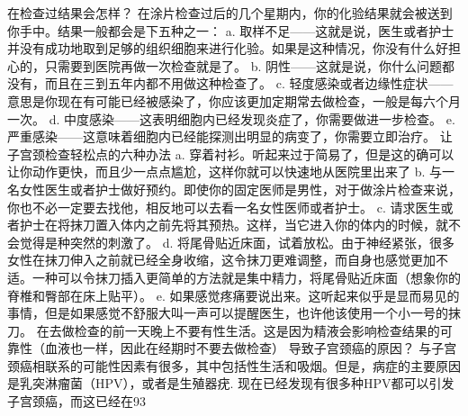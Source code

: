 \documentclass[12pt,UTF8]{ctexbook}
\begin{document}
在检查过结果会怎样？
在涂片检查过后的几个星期内，你的化验结果就会被送到你手中。结果一般都会是下五种之一：
a. 取样不足——这就是说，医生或者护士并没有成功地取到足够的组织细胞来进行化验。如果是这种情况，你没有什么好担心的，只需要到医院再做一次检查就是了。
b. 阴性——这就是说，你什么问题都没有，而且在三到五年内都不用做这种检查了。
c. 轻度感染或者边缘性症状——意思是你现在有可能已经被感染了，你应该更加定期常去做检查，一般是每六个月一次。
d. 中度感染——这表明细胞内已经发现炎症了，你需要做进一步检查。
e. 严重感染——这意味着细胞内已经能探测出明显的病变了，你需要立即治疗。
让子宫颈检查轻松点的六种办法
a. 穿着衬衫。听起来过于简易了，但是这的确可以让你动作更快，而且少一点点尴尬，这样你就可以快速地从医院里出来了
b. 与一名女性医生或者护士做好预约。即使你的固定医师是男性，对于做涂片检查来说，你也不必一定要去找他，相反地可以去看一名女性医师或者护士。
c. 请求医生或者护士在将抹刀置入体内之前先将其预热。这样，当它进入你的体内的时候，就不会觉得是种突然的刺激了。
d. 将尾骨贴近床面，试着放松。由于神经紧张，很多女性在抹刀伸入之前就已经全身收缩，这令抹刀更难调整，而自身也感觉更加不适。一种可以令抹刀插入更简单的方法就是集中精力，将尾骨贴近床面（想象你的脊椎和臀部在床上贴平）。
e. 如果感觉疼痛要说出来。这听起来似乎是显而易见的事情，但是如果感觉不舒服大叫一声可以提醒医生，也许他该使用一个小一号的抹刀。
在去做检查的前一天晚上不要有性生活。这是因为精液会影响检查结果的可靠性（血液也一样，因此在经期时不要去做检查）
导致子宫颈癌的原因？
与子宫颈癌相联系的可能性因素有很多，其中包括性生活和吸烟。但是，病症的主要原因是乳突淋瘤菌（HPV），或者是生殖器疣. 现在已经发现有很多种HPV都可以引发子宫颈癌，而这已经在93%
\end{document}
